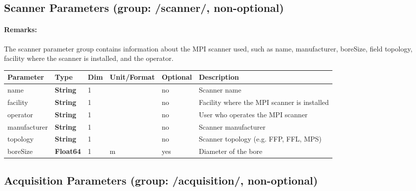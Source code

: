 \documentclass[landscape,a4paper]{article} %
\newcommand{\inltab}[1]{{\ttfamily\bfseries\color{blue}#1}}
\newcommand{\inlvar}[1]{{\ttfamily#1}}
\begin{document}
\subsection{Scanner Parameters (group: \inlvar{/scanner/}, non-optional)}

\begin{multicols}{2}
\paragraph{Remarks:} The scanner parameter group contains information about the MPI scanner used, such as \inlvar{name}, \inlvar{manufacturer}, \inlvar{boreSize}, field \inlvar{topology}, \inlvar{facility} where the scanner is installed, and the \inlvar{operator}.
\end{multicols}

\noindent \begin{tabularx}{\columnwidth}{lllllX}
\noindent \textbf{Parameter} & \textbf{Type} & \textbf{Dim} & \textbf{Unit/Format} & \textbf{Optional} & \textbf{Description} \\ \hline 
\inlvar{name} & \inltab{String} & 1 & & no & Scanner name \\ \hline 
\inlvar{facility} & \inltab{String} & 1 & & no & Facility where the MPI scanner is installed \\ \hline 
\inlvar{operator} & \inltab{String} & 1 & & no & User who operates the MPI scanner \\ \hline 
\inlvar{manufacturer} & \inltab{String} & 1 & & no & Scanner manufacturer \\ \hline 
\inlvar{topology} & \inltab{String} & 1 & & no & Scanner topology (e.g. FFP, FFL, MPS)\\ \hline 
\inlvar{boreSize} & \inltab{Float64} & 1 & m & yes & Diameter of the bore \\ \hline 
\end{tabularx}

\newpage
\subsection{Acquisition Parameters (group: \inlvar{/acquisition/}, non-optional)}
\end{document}
